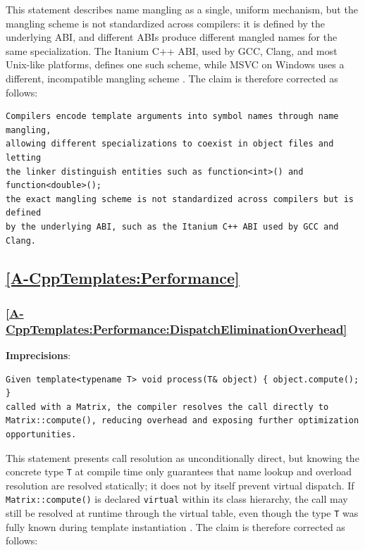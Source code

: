 \documentclass[11pt]{report}
\begin{document}
This statement describes name mangling as a single, uniform mechanism, but the
mangling scheme is not standardized across compilers: it is defined by the
underlying ABI, and different ABIs produce different mangled names for the
same specialization. The Itanium C++ ABI, used by GCC, Clang, and most
Unix-like platforms, defines one such scheme, while MSVC on Windows uses a
different, incompatible mangling scheme \cite{itanium_abi}. The claim is
therefore corrected as follows:

\begin{Verbatim}[breaklines=true]
Compilers encode template arguments into symbol names through name mangling,
allowing different specializations to coexist in object files and letting
the linker distinguish entities such as function<int>() and function<double>();
the exact mangling scheme is not standardized across compilers but is defined
by the underlying ABI, such as the Itanium C++ ABI used by GCC and Clang.
\end{Verbatim}

\subsection*{\hyperref[A-CppTemplates:Performance]{\ref*{A-CppTemplates:Performance} }}
\subsubsection*{\hyperref[A-CppTemplates:Performance:DispatchEliminationOverhead]{\ref*{A-CppTemplates:Performance:DispatchEliminationOverhead} }}
\noindent\textbf{Imprecisions}:

\begin{Verbatim}[breaklines=true]
Given template<typename T> void process(T& object) { object.compute(); }
called with a Matrix, the compiler resolves the call directly to
Matrix::compute(), reducing overhead and exposing further optimization
opportunities.
\end{Verbatim}

This statement presents call resolution as unconditionally direct, but knowing
the concrete type \texttt{T} at compile time only guarantees that name lookup
and overload resolution are resolved statically; it does not by itself prevent
virtual dispatch. If \texttt{Matrix::compute()} is declared \texttt{virtual}
within its class hierarchy, the call may still be resolved at runtime through
the virtual table, even though the type \texttt{T} was fully known during
template instantiation \cite{stroustrup2013}. The claim is therefore corrected
as follows:
\end{document}
